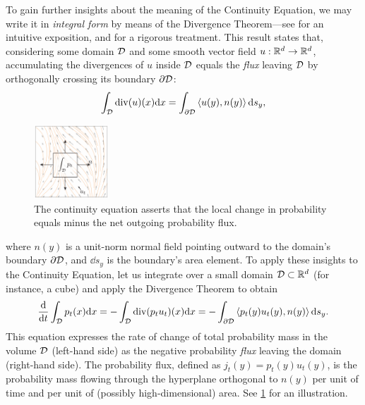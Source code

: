 \documentclass{fairmeta}
\renewcommand{\eqref}[1]{\labelcref{#1}}
\numberwithin{equation}{section}
\begin{document}
To gain further insights about the meaning of the Continuity Equation, we may write it in \emph{integral form} by means of the Divergence Theorem---see \citet{matthews2012vector} for an intuitive exposition, and \citet{loomis1968advanced} for a rigorous treatment.
This result states that, considering some domain ${\mathcal{D}}$ and some smooth vector field $u:\mathbb R^d\rightarrow\mathbb R^d$, accumulating the divergences of $u$ inside ${\mathcal{D}}$ equals the \emph{flux} leaving ${\mathcal{D}}$ by orthogonally crossing its boundary $\partial {\mathcal{D}}$:
\begin{equation}
    \int_{\mathcal{D}} \mathrm{div}(u)(x)\mathrm{d} x = \int_{\partial {\mathcal{D}}} \left \langle u(y),n(y) \right \rangle\mathrm{d} s_y,
\end{equation}
\begin{figure}
  \begin{center}    \includegraphics[width=0.25\textwidth]{assets/continuity.pdf}
  \end{center}
  \caption{The continuity equation asserts that the local change in probability equals minus the net outgoing probability flux.}\label{fig:continuity}
\end{figure} 
where $n(y)$ is a unit-norm normal field pointing outward to the domain's boundary $\partial{\mathcal{D}}$, and $\dd s_y$ is the boundary's area element.
To apply these insights to the Continuity Equation, let us integrate \eqref{e:continuity} over a small domain ${\mathcal{D}}\subset\mathbb R^d$ (for instance, a cube) and apply the Divergence Theorem to obtain
\begin{equation}\label{ea:continuity_intuitive}
    \frac{\mathrm{d}}{\mathrm{d} t} \int_{\mathcal{D}} p_t(x) \mathrm{d} x = -\int_{\mathcal{D}} \mathrm{div}(p_t u_t)(x) \mathrm{d} x = -\int_{\partial {\mathcal{D}}}  \left \langle p_t(y) u_t(y),n(y) \right \rangle\mathrm{d} s_y.
\end{equation}
This equation expresses the rate of change of total probability mass in the volume ${\mathcal{D}}$ (left-hand side) as the negative probability \emph{flux} leaving the domain (right-hand side).
The probability flux, defined as $j_t(y)=p_t(y)u_t(y)$, is the probability mass flowing through the hyperplane orthogonal to $n(y)$ per unit of time and per unit of (possibly high-dimensional) area.
See \cref{fig:continuity} for an illustration.
\end{document}
